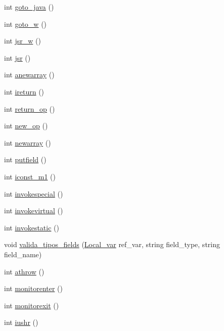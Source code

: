 \begin{DoxyCompactItemize}
\item 
int \hyperlink{classInterpretador_aa0161b5eb3e9e02601eb7022312165fc}{goto\+\_\+java} ()
\item 
int \hyperlink{classInterpretador_a075d96a650da2b7c3ba68addf3e3d30a}{goto\+\_\+w} ()
\item 
int \hyperlink{classInterpretador_a0911dd50c6ba1610c234b1209f807f13}{jsr\+\_\+w} ()
\item 
int \hyperlink{classInterpretador_ac59150e2b4be1b508c6d7123e33da84c}{jsr} ()
\item 
int \hyperlink{classInterpretador_a994eae4c5f405862e83940390594f5d3}{anewarray} ()
\item 
int \hyperlink{classInterpretador_a48c0f7b1fc90e4ffea05f027efb7f344}{ireturn} ()
\item 
int \hyperlink{classInterpretador_a76da2e131bddc3824c711058918f4785}{return\+\_\+op} ()
\item 
int \hyperlink{classInterpretador_a6b50fd948bdde87c69a9be341e5840f7}{new\+\_\+op} ()
\item 
int \hyperlink{classInterpretador_a5237cb4021921228042019c4b5d858d6}{newarray} ()
\item 
int \hyperlink{classInterpretador_aab12d780da60172eec0cbcfcd56bdc89}{putfield} ()
\item 
int \hyperlink{classInterpretador_a9683a40e98a165b7e3e5ca080c2760f1}{iconst\+\_\+m1} ()
\item 
int \hyperlink{classInterpretador_af1af18d5c72e72c8ccee52c83d3e4160}{invokespecial} ()
\item 
int \hyperlink{classInterpretador_af0c061608e03b8d89a493a1b9cb9d4b4}{invokevirtual} ()
\item 
int \hyperlink{classInterpretador_af6589e2dbd6fa8c03aa6134f77db52e3}{invokestatic} ()
\item 
void \hyperlink{classInterpretador_a84a3dd88cffca0a80bfbafb2453c9866}{valida\+\_\+tipos\+\_\+fields} (\hyperlink{classLocal__var}{Local\+\_\+var} ref\+\_\+var, string field\+\_\+type, string field\+\_\+name)
\item 
int \hyperlink{classInterpretador_ab7446cc6b524369b63e573b634985c6b}{athrow} ()
\item 
int \hyperlink{classInterpretador_aab511f1c7db0899ae54ca1e61b1e4d56}{monitorenter} ()
\item 
int \hyperlink{classInterpretador_aefbc157baa70b4f8477b1fda90e6fca5}{monitorexit} ()
\item 
int \hyperlink{classInterpretador_a892de1102ef467a56bd979a9ec574cf2}{iushr} ()

\end{DoxyCompactItemize}
